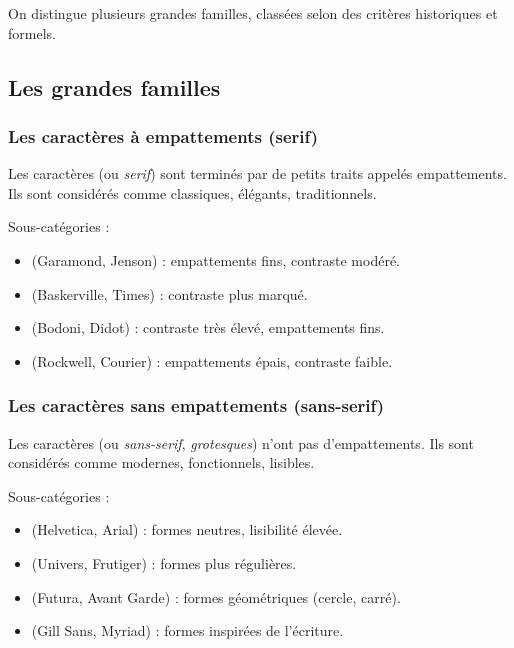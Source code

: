 On distingue plusieurs grandes familles, classées selon des critères historiques et formels.

\subsection{Les grandes familles}

\subsubsection{Les caractères à empattements (serif)}

Les caractères  (ou \emph{serif}) sont terminés par de petits traits appelés empattements. Ils sont considérés comme classiques, élégants, traditionnels.

Sous-catégories :

\begin{itemize}
    \item {} (Garamond, Jenson) : empattements fins, contraste modéré.
    \item {} (Baskerville, Times) : contraste plus marqué.
    \item {} (Bodoni, Didot) : contraste très élevé, empattements fins.
    \item {} (Rockwell, Courier) : empattements épais, contraste faible.
\end{itemize}

\subsubsection{Les caractères sans empattements (sans-serif)}

Les caractères  (ou \emph{sans-serif}, \emph{grotesques}) n'ont pas d'empattements. Ils sont considérés comme modernes, fonctionnels, lisibles.

Sous-catégories :

\begin{itemize}
    \item {} (Helvetica, Arial) : formes neutres, lisibilité élevée.
    \item {} (Univers, Frutiger) : formes plus régulières.
    \item {} (Futura, Avant Garde) : formes géométriques (cercle, carré).
    \item {} (Gill Sans, Myriad) : formes inspirées de l'écriture.
\end{itemize}

